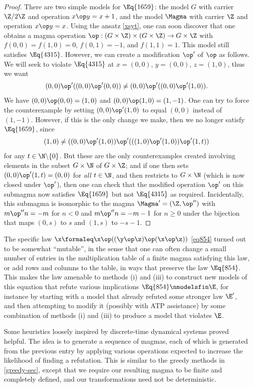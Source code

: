 \begin{proof}  There are two simple models for $\Eq{1659}$: the model $G$ with carrier $\Z/2\Z$ and operation $x \op y = x+1$, and the model $\Magma$ with carrier $\Z$ and operation $x \op y = x$.  Using the ansatz \eqref{xsyt}, one can soon discover that one obtains a magma operation $\op: (G \times \Z) \times (G \times \Z) \to G \times \Z$ with $f(0,0)=f(1,0)=0$, $f(0,1)=-1$, and $f(1,1)=1$.  This model still satisfies $\Eq{4315}$. However, we can create a modification $\op'$ of $\op$ as follows.  We will seek to violate $\Eq{4315}$ at $x = (0,0)$, $y = (0,0)$, $z = (1,0)$, thus we want
$$ (0,0) \op' ((0,0) \op' (0,0)) \neq (0,0) \op' ((0,0) \op' (1,0)).$$
We have $(0,0) \op (0,0) = (1,0)$ and $(0,0) \op (1,0) = (1,-1)$.  One can try to force the counterexample by setting $(0,0) \op' (1,0)$ to equal $(0,0)$ instead of $(1,-1)$. However, if this is the only change we make, then we no longer satisfy $\Eq{1659}$, since
$$ (1,0) \neq ((0,0) \op' (1,0)) \op' (((1,0) \op' (1,0)) \op' (1,t))$$
for any $t \in \N \backslash \{0\}$. But these are the only counterexamples created involving elements in the subset $G \times \N$ of $G \times \Z$; and if one then sets $(0,0) \op' (1,t) = (0,0)$ for \emph{all} $t \in \N$, and then restricts to $G \times \N$ (which is now closed under $\op'$), then one can check that the modified operation $\op'$ on this submagma now satisfies $\Eq{1659}$ but not $\Eq{4315}$ as required.
Incidentally, this submagma is isomorphic to the magma $\Magma'=(\Z,\op'')$ with $m\op''n=-m$ for $n<0$ and $m\op''n=-m-1$ for $n\geq 0$ under the bijection that maps $(0,s)$ to $s$ and $(1,s)$ to $-s-1$.
\end{proof}

The specific law $\x \formaleq \x \op ((\y \op \z) \op (\x \op \z))$ \eqref{eq854} turned out to be somewhat ``mutable'', in the sense that one can often change a small number
 of entries in the multiplication table of a finite magma satisfying this law, or add rows and columns to the table,
 in ways that preserve the law $\Eq{854}$.  This makes the law amenable to methods (i) and (iii) to construct new models of this equation that
 refute various implications  $\Eq{854} \nmodelsfin \E$, for instance by starting with a model that already refuted some stronger law ${\E'}$, and then attempting to modify it
 (possibly with ATP assistance) by some combination of methods (i) and (iii) to produce a model that violates $\E$.

 Some heuristics loosely inspired by discrete-time dynamical systems proved helpful.
 The idea is to generate a sequence of magmas, each of which is generated from the previous entry by applying various operations expected to increase the likelihood of
 finding a refutation.  This is similar to the greedy methods in \ref{greedy-sec}, except that we require our resulting magma to be finite and completely
 defined, and our transformations need not be deterministic.

